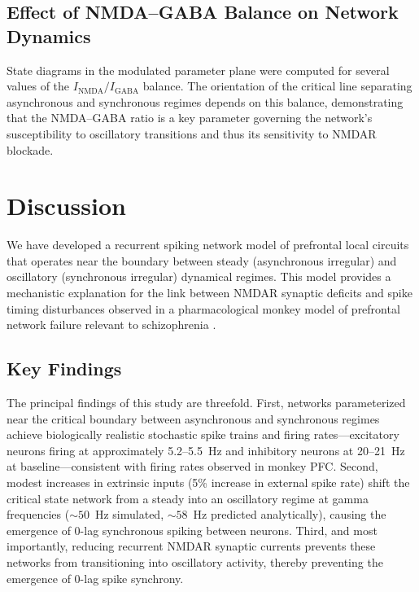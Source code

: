 \documentclass[12pt]{article}
\begin{document}
\subsection{Effect of NMDA--GABA Balance on Network Dynamics}

State diagrams in the modulated parameter plane were computed for several values of the $I_{\text{NMDA}}/I_{\text{GABA}}$ balance. The orientation of the critical line separating asynchronous and synchronous regimes depends on this balance, demonstrating that the NMDA--GABA ratio is a key parameter governing the network's susceptibility to oscillatory transitions and thus its sensitivity to NMDAR blockade.

\section{Discussion}

We have developed a recurrent spiking network model of prefrontal local circuits that operates near the boundary between steady (asynchronous irregular) and oscillatory (synchronous irregular) dynamical regimes. This model provides a mechanistic explanation for the link between NMDAR synaptic deficits and spike timing disturbances observed in a pharmacological monkey model of prefrontal network failure relevant to schizophrenia \citep{Zick2018}.

\subsection{Key Findings}

The principal findings of this study are threefold. First, networks parameterized near the critical boundary between asynchronous and synchronous regimes achieve biologically realistic stochastic spike trains and firing rates---excitatory neurons firing at approximately 5.2--5.5~Hz and inhibitory neurons at 20--21~Hz at baseline---consistent with firing rates observed in monkey PFC. Second, modest increases in extrinsic inputs (5\% increase in external spike rate) shift the critical state network from a steady into an oscillatory regime at gamma frequencies (${\sim}50$~Hz simulated, ${\sim}58$~Hz predicted analytically), causing the emergence of 0-lag synchronous spiking between neurons. Third, and most importantly, reducing recurrent NMDAR synaptic currents prevents these networks from transitioning into oscillatory activity, thereby preventing the emergence of 0-lag spike synchrony.
\end{document}
